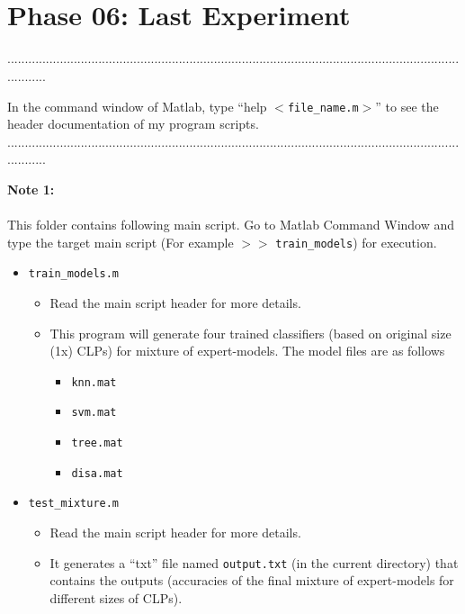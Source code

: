 \documentclass[a4paper,12pt]{article} %
\begin{document}
\pagestyle{fancy}
 \renewcommand{\headrulewidth}{1pt}
\sectionfont{\fontsize{12}{15}\selectfont}
\vspace{2cm}


\section*{\\Phase 06: Last Experiment}
............................................................................................................................................

In the command window of Matlab, type ``help $<$\verb|file_name.m|$>$'' to see the header documentation of my program scripts.\\
............................................................................................................................................

\textbf{Note 1:}\\\\
This folder contains following main script. Go to Matlab Command Window and type the target main script (For example $>>$  \verb|train_models|) for execution.
\begin{itemize}
	\item \verb|train_models.m|   
		\begin{itemize}
		\item Read the main script header for more details.
		\item This program will generate four trained classifiers (based on original size (1x) CLPs) for mixture of expert-models. The model files are as follows
		
			\begin{itemize}
				\item \verb|knn.mat|
				\item \verb|svm.mat|
				\item \verb|tree.mat|
				\item \verb|disa.mat|
				
			\end{itemize}
	\end{itemize}
		
	\item \verb|test_mixture.m|
		\begin{itemize}
		\item Read the main script header for more details.   	
		\item It generates a ``txt'' file named \verb|output.txt| (in the current directory) that contains the outputs (accuracies of the final mixture of expert-models for different sizes of CLPs).	
			
		\end{itemize}
		
\end{itemize}
\end{document}
